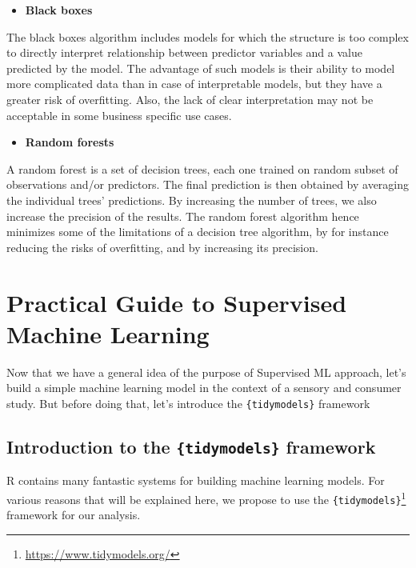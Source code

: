 \documentclass[
]{krantz}
\providecommand{\tightlist}{%
  \setlength{\itemsep}{0pt}\setlength{\parskip}{0pt}}
\renewcommand{\href}[2]{#2\footnote{\url{#1}}}
\begin{document}
\begin{itemize}
\tightlist
\item
  \textbf{Black boxes}
\end{itemize}

The black boxes algorithm includes models for which the structure is too complex to directly interpret relationship between predictor variables and a value predicted by the model. The advantage of such models is their ability to model more complicated data than in case of interpretable models, but they have a greater risk of overfitting. Also, the lack of clear interpretation may not be acceptable in some business specific use cases.

\begin{itemize}
\tightlist
\item
  \textbf{Random forests}
\end{itemize}

A random forest is a set of decision trees, each one trained on random subset of observations and/or predictors. The final prediction is then obtained by averaging the individual trees' predictions. By increasing the number of trees, we also increase the precision of the results. The random forest algorithm hence minimizes some of the limitations of a decision tree algorithm, by for instance reducing the risks of overfitting, and by increasing its precision.

\hypertarget{practical-guide-to-supervised-machine-learning}{%
\section{Practical Guide to Supervised Machine Learning}\label{practical-guide-to-supervised-machine-learning}}

Now that we have a general idea of the purpose of Supervised ML approach, let's build a simple machine learning model in the context of a sensory and consumer study. But before doing that, let's introduce the \texttt{\{tidymodels\}} framework

\hypertarget{introduction-to-the-tidymodels-framework}{%
\subsection{\texorpdfstring{Introduction to the \texttt{\{tidymodels\}} framework}{Introduction to the \{tidymodels\} framework}}\label{introduction-to-the-tidymodels-framework}}

R contains many fantastic systems for building machine learning models. For various reasons that will be explained here, we propose to use the \href{https://www.tidymodels.org/}{\texttt{\{tidymodels\}}} framework for our analysis.
\end{document}
